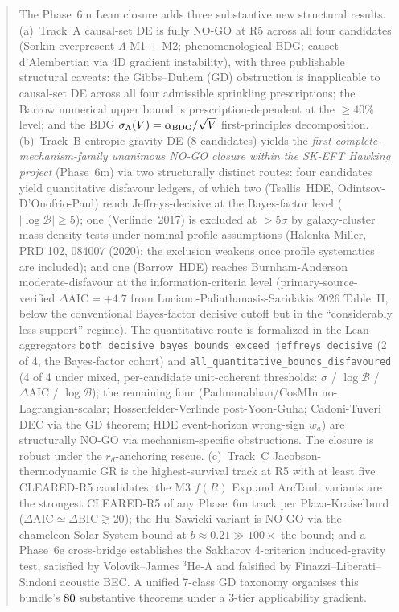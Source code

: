 \documentclass[aps,prd,reprint,nofootinbib,superscriptaddress]{revtex4-2}
\begin{document}
\begin{abstract}
The Phase~6m Lean closure adds three substantive new structural
results. (a)~Track~A causal-set DE is fully NO-GO at R5 across all four
candidates (Sorkin everpresent-$\Lambda$ M1 + M2; phenomenological BDG; causet
d'Alembertian via 4D gradient instability), with three publishable structural
caveats: the Gibbs--Duhem (GD) obstruction is inapplicable to causal-set DE
across all four admissible sprinkling prescriptions; the Barrow numerical
upper bound is prescription-dependent at the $\geq 40\%$ level; and the BDG
$\sigma_\Lambda(V) = \alpha_{\rm BDG}/\sqrt{V}$ first-principles
decomposition. (b)~Track~B entropic-gravity DE (8 candidates) yields the
\emph{first complete-mechanism-family unanimous NO-GO closure within
the SK-EFT Hawking project} (Phase~6m)
via two structurally distinct routes: four candidates yield
quantitative disfavour ledgers, of which two (Tsallis~HDE,
Odintsov-D'Onofrio-Paul) reach Jeffreys-decisive at the
Bayes-factor level ($|\!\log\mathcal{B}| \geq 5$); one (Verlinde~2017)
is excluded at $>5\sigma$ by galaxy-cluster mass-density tests under
nominal profile assumptions (Halenka-Miller, PRD 102, 084007 (2020);
the exclusion weakens once profile systematics are included); and one
(Barrow~HDE) reaches Burnham-Anderson moderate-disfavour at the
information-criteria level (primary-source-verified
$\Delta\!\text{AIC} = +4.7$ from Luciano-Paliathanasis-Saridakis 2026
Table~II, below the conventional Bayes-factor decisive cutoff but in
the ``considerably less support'' regime). The quantitative route is
formalized in the Lean aggregators
\texttt{both\_decisive\_bayes\_bounds\_exceed\_jeffreys\_decisive}
(2 of 4, the Bayes-factor cohort) and
\texttt{all\_quantitative\_bounds\_disfavoured} (4 of 4
under mixed, per-candidate unit-coherent thresholds:
$\sigma$ / $\log\mathcal{B}$ / $\Delta\!\text{AIC}$ /
$\log\mathcal{B}$); the
remaining four (Padmanabhan/CosMIn no-Lagrangian-scalar; Hossenfelder-Verlinde
post-Yoon-Guha; Cadoni-Tuveri DEC via the GD theorem; HDE event-horizon
wrong-sign $w_a$) are structurally NO-GO via mechanism-specific
obstructions. The closure is robust under the $r_d$-anchoring rescue. (c)~Track~C Jacobson-thermodynamic GR is the
highest-survival track at R5 with at least five CLEARED-R5 candidates;
the M3 $f(R)$ Exp and ArcTanh variants are the strongest CLEARED-R5
of any Phase~6m track per Plaza-Kraiselburd ($\Delta\!\text{AIC} \simeq
\Delta\!\text{BIC} \gtrsim 20$); the Hu--Sawicki variant is NO-GO via the
chameleon Solar-System bound at $b \approx 0.21 \gg 100\times$
the bound; and a Phase~6e cross-bridge establishes the Sakharov
4-criterion induced-gravity test, satisfied by Volovik--Jannes
${}^3\!\text{He-A}$ and falsified by Finazzi--Liberati--Sindoni acoustic
BEC. A unified 7-class GD taxonomy organises this bundle's
$\bundleTheorems$ substantive theorems under a 3-tier applicability
gradient.


\end{abstract}
\end{document}
